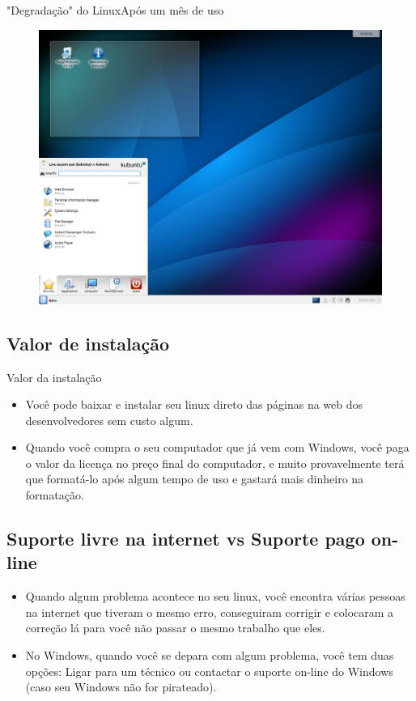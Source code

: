 \documentclass{beamer}
\begin{document}
\begin{frame}{"Degradação" do Linux}{Após um mês de uso}
    \begin{figure}[h!]
        \centering
        \includegraphics[scale=0.25]{Kubuntu.png}
    \end{figure}
\end{frame}

\subsection{Valor de instalação}
\begin{frame}{Valor da instalação}
    \begin{itemize}
        \item{Você pode baixar e instalar seu linux direto das páginas na web dos desenvolvedores sem custo algum.}
\item{Quando você compra o seu computador que já vem com Windows, você paga o valor da licença no preço final do computador, e muito provavelmente terá que formatá-lo após algum tempo de uso e gastará mais dinheiro na formatação.}
    \end{itemize}
\end{frame}


\subsection{Suporte livre na internet vs Suporte pago on-line}
\begin{frame} 
\begin{itemize}
        \item{Quando algum problema acontece no seu linux, você encontra várias pessoas na internet que tiveram o mesmo erro, conseguiram corrigir e colocaram a correção lá para você não passar o mesmo trabalho que eles.}
\item{No Windows, quando você se depara com algum problema, você tem duas opções: Ligar para um técnico ou contactar o suporte on-line do Windows (caso seu Windows não for pirateado).}
    \end{itemize}
\end{frame}
\end{document}
